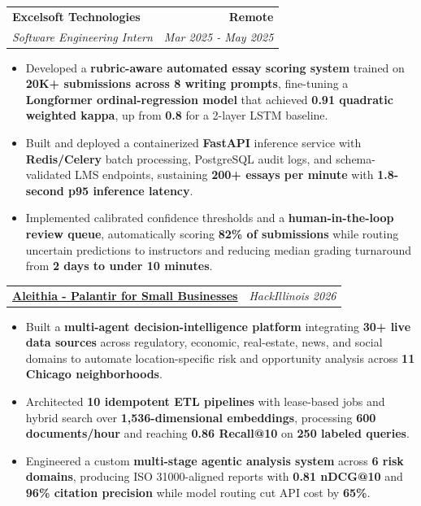 \documentclass[10pt,letterpaper]{article}
\makeatletter
\newcommand{\resumeFallback}[1]{{\resumeFallbackFont#1}}
\newcommand{\resumeSection}[1]{%
  \par\vspace{2.7pt}%
  {\fontsize{11.5}{12}\selectfont\bfseries
    \underline{\makebox[\linewidth][l]{#1}}%
  }%
  \par\vspace{2.1pt}%
}
\newcommand{\resumeEntry}[4]{%
  \begin{tabular*}{\linewidth}{@{}l@{\extracolsep{\fill}}r@{}}
    \textbf{#1} & \textbf{#2} \\
    \textit{#3} & \textit{#4}
  \end{tabular*}\par
}
\newcommand{\projectEntry}[2]{%
  \begin{tabular*}{\linewidth}{@{}l@{\extracolsep{\fill}}r@{}}
    \textbf{\underline{#1}} & {\resumeBulletFont\itshape #2\/}
  \end{tabular*}\par
}
\newenvironment{resumeItems}{%
  \begin{itemize}[
    leftmargin=0.50in,
    label={\resumeBulletFont\textbullet},
    labelsep=0.18in,
    labelwidth=0.10in,
    itemindent=0pt,
    topsep=0pt,
    partopsep=0pt,
    parsep=0pt,
    itemsep=0.25pt
  ]
}{%
  \end{itemize}\vspace{-1.6pt}
}
\newcommand{\resumeEntryGap}{\par\vspace{2.4pt}}
\makeatother
\begin{document}
\resumeEntryGap
\resumeEntry
  {Excelsoft Technologies}
  {Remote}
  {Software Engineering Intern}
  {Mar 2025 \resumeFallback{-} May 2025}
\begin{resumeItems}
  \item Developed a \textbf{rubric-aware automated essay scoring system} trained on \textbf{20K+ submissions across 8 writing prompts}, fine-tuning a \textbf{Longformer ordinal-regression model} that achieved \textbf{0.91 quadratic weighted kappa}, up from \textbf{0.8\resumeFallback{4}} for a 2-layer LSTM baseline.
  \item Built and deployed a containerized \textbf{FastAPI} inference service with \textbf{Redis/Celery} batch processing, PostgreSQL audit logs, and schema-validated LMS endpoints, sustaining \textbf{200+ essays per minute} with \textbf{1.8-second p95 inference latency}.
  \item Implemented calibrated confidence thresholds and a \textbf{human-in-the-loop review queue}, automatically scoring \textbf{82\% of submissions} while routing uncertain predictions to instructors and reducing median grading turnaround from \textbf{2 days to under 10 minutes}.
\end{resumeItems}

\resumeSection{PROJECTS}
\projectEntry
  {\href{https://github.com/IBS27/aleithia}{Aleithia - Palantir for Small Businesses}}
  {HackIllinois 2026}
\begin{resumeItems}
  \item Built a \textbf{multi-agent decision-intelligence platform} integrating \textbf{30+ live data sources} across regulatory, economic, real-estate, news, and social domains to automate location-specific risk and opportunity analysis across \textbf{11 Chicago neighborhoods}.
  \item Architected \textbf{10 idempotent ETL pipelines} with lease-based jobs and hybrid search over \textbf{1,536-dimensional embeddings}, processing \textbf{600 documents/hour} and reaching \textbf{0.86 Recall\resumeFallback{@}10} on \textbf{250 labeled queries}.
  \item Engineered a custom \textbf{multi-stage agentic analysis system} across \textbf{6 risk domains}, producing ISO 31000-aligned reports with \textbf{0.81 nDCG\resumeFallback{@}10} and \textbf{96\% citation precision} while model routing cut API cost by \textbf{65\%}.
\end{resumeItems}
\end{document}
